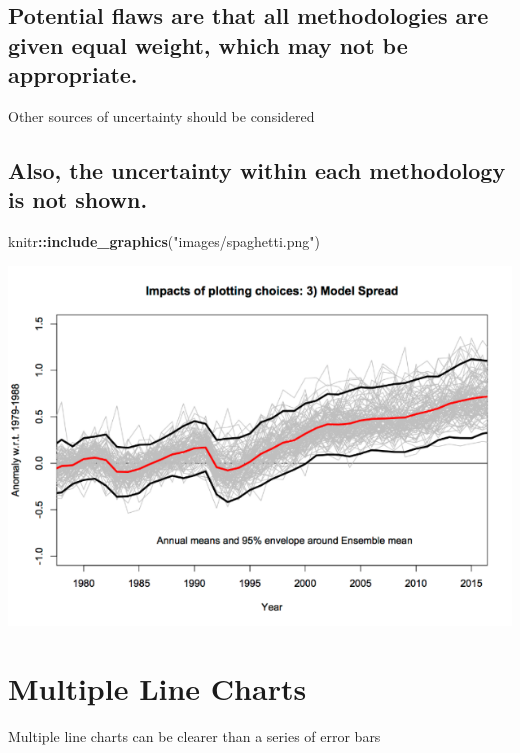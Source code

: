 \documentclass[]{book}
\newenvironment{Shaded}{\begin{snugshade}}{\end{snugshade}}
\newcommand{\KeywordTok}[1]{\textcolor[rgb]{0.13,0.29,0.53}{\textbf{#1}}}
\newcommand{\StringTok}[1]{\textcolor[rgb]{0.31,0.60,0.02}{#1}}
\newcommand{\OperatorTok}[1]{\textcolor[rgb]{0.81,0.36,0.00}{\textbf{#1}}}
\newcommand{\NormalTok}[1]{#1}
\begin{document}
\subsection{Potential flaws are that all methodologies are given equal
weight, which may not be
appropriate.}\label{potential-flaws-are-that-all-methodologies-are-given-equal-weight-which-may-not-be-appropriate.}

 Other sources of uncertainty should be considered

\subsection{Also, the uncertainty within each methodology is not
shown.}\label{also-the-uncertainty-within-each-methodology-is-not-shown.}

\begin{Shaded}
\begin{Highlighting}[]
\NormalTok{knitr}\OperatorTok{::}\KeywordTok{include_graphics}\NormalTok{(}\StringTok{"images/spaghetti.png"}\NormalTok{)}
\end{Highlighting}
\end{Shaded}

\begin{center}\includegraphics{images/spaghetti} \end{center}

\section{Multiple Line Charts}\label{multiple-line-charts}

Multiple line charts can be clearer than a series of error bars
\end{document}
